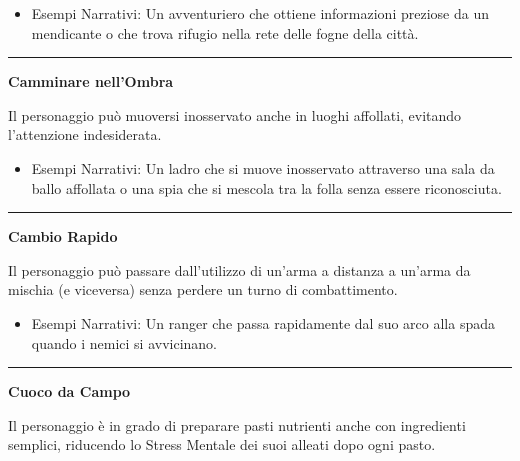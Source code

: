 \documentclass[../manuale_main.tex]{subfiles}
\begin{document}
\begin{itemize}
\item Esempi Narrativi: Un avventuriero che ottiene informazioni preziose da un mendicante o che trova rifugio nella rete delle fogne della città.
\end{itemize}

\vspace{0.5cm}
\noindent
\begin{center}
\rule{\textwidth}{0.4pt} 
\end{center}
\vspace{0.5cm}

\begin{center}
\textbf{\large{Camminare nell’Ombra}}\\
\end{center}
Il personaggio può muoversi inosservato anche in luoghi affollati, evitando l’attenzione indesiderata.

\begin{itemize}
\item Esempi Narrativi: Un ladro che si muove inosservato attraverso una sala da ballo affollata o una spia che si mescola tra la folla senza essere riconosciuta.
\end{itemize}

\vspace{0.5cm}
\noindent
\begin{center}
\rule{\textwidth}{0.4pt} 
\end{center}
\vspace{0.5cm}

\begin{center}
\textbf{\large{Cambio Rapido}}\\
\end{center}
Il personaggio può passare dall’utilizzo di un’arma a distanza a un’arma da mischia (e viceversa) senza perdere un turno di combattimento.

\begin{itemize}
\item Esempi Narrativi: Un ranger che passa rapidamente dal suo arco alla spada quando i nemici si avvicinano.
\end{itemize}

\vspace{0.5cm}
\noindent
\begin{center}
\rule{\textwidth}{0.4pt} 
\end{center}
\vspace{0.5cm}


\begin{center}
\textbf{\large{Cuoco da Campo}}\\
\end{center}
Il personaggio è in grado di preparare pasti nutrienti anche con ingredienti semplici, riducendo lo Stress Mentale dei suoi alleati dopo ogni pasto.
\end{document}
